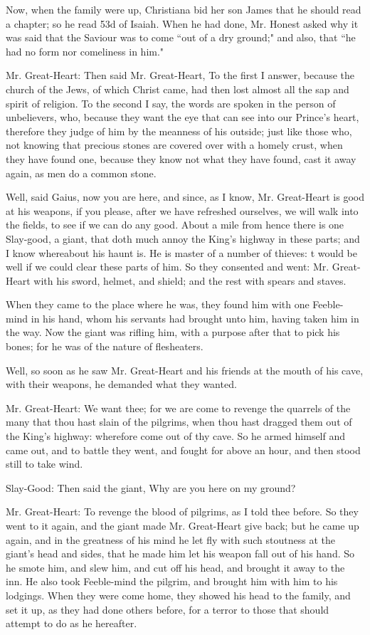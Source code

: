 Now, when the family were up, Christiana bid her son James that he should read a chapter; so he read 53d of Isaiah. When he had done, Mr. Honest asked why it was said that the Saviour was to come ``out of a dry ground;" and also, that ``he had no form nor comeliness in him."

Mr. Great-Heart: Then said Mr. Great-Heart, To the first I answer, because the church of the Jews, of which Christ came, had then lost almost all the sap and spirit of religion. To the second I say, the words are spoken in the person of unbelievers, who, because they want the eye that can see into our Prince's heart, therefore they judge of him by the meanness of his outside; just like those who, not knowing that precious stones are covered over with a homely crust, when they have found one, because they know not what they have found, cast it away again, as men do a common stone.

Well, said Gaius, now you are here, and since, as I know, Mr. Great-Heart is good at his weapons, if you please, after we have refreshed ourselves, we will walk into the fields, to see if we can do any good. About a mile from hence there is one Slay-good, a giant, that doth much annoy the King's highway in these parts; and I know whereabout his haunt is. He is master of a number of thieves: t would be well if we could clear these parts of him. So they consented and went: Mr. Great-Heart with his sword, helmet, and shield; and the rest with spears and staves.

When they came to the place where he was, they found him with one Feeble-mind in his hand, whom his servants had brought unto him, having taken him in the way. Now the giant was rifling him, with a purpose after that to pick his bones; for he was of the nature of flesheaters.

Well, so soon as he saw Mr. Great-Heart and his friends at the mouth of his cave, with their weapons, he demanded what they wanted.

Mr. Great-Heart: We want thee; for we are come to revenge the quarrels of the many that thou hast slain of the pilgrims, when thou hast dragged them out of the King's highway: wherefore come out of thy cave. So he armed himself and came out, and to battle they went, and fought for above an hour, and then stood still to take wind.

Slay-Good: Then said the giant, Why are you here on my ground?

Mr. Great-Heart: To revenge the blood of pilgrims, as I told thee before. So they went to it again, and the giant made Mr. Great-Heart give back; but he came up again, and in the greatness of his mind he let fly with such stoutness at the giant's head and sides, that he made him let his weapon fall out of his hand. So he smote him, and slew him, and cut off his head, and brought it away to the inn. He also took Feeble-mind the pilgrim, and brought him with him to his lodgings. When they were come home, they showed his head to the family, and set it up, as they had done others before, for a terror to those that should attempt to do as he hereafter.


